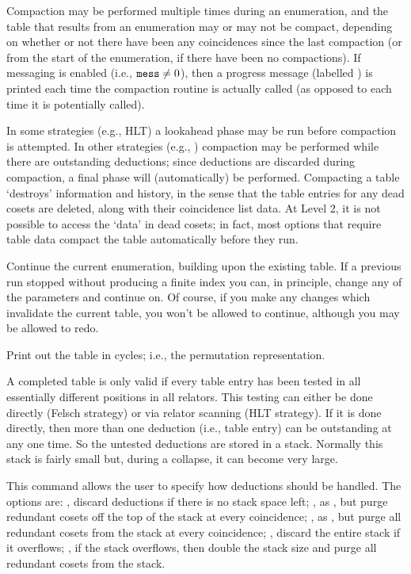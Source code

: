 Compaction may be performed multiple times during an enumeration, and the
  table that results from an enumeration may or may not be compact,
  depending on whether or not there have been any coincidences since the
  last compaction (or from the start of the enumeration, if there have been
  no compactions).
If messaging is enabled (i.e., $\texttt{mess} \ne 0$), then a progress
  message (labelled ) is printed each time the compaction routine
  is actually called (as opposed to each time it is potentially called).

In some strategies (e.g., HLT) a lookahead phase may be run before
  compaction is attempted.
In other strategies (e.g., ) compaction may be performed while
  there are outstanding deductions; since deductions are discarded during
  compaction, a final  phase will (automatically) be performed.
%
Compacting a table `destroys' information and history, in the sense that
  the table entries for any dead cosets are deleted, along with their
  coincidence list data.
At Level 2, it is not possible to access the `data' in dead cosets; in
  fact, most options that require table data compact the table 
  automatically before they run.

\quad{}

Continue the current enumeration, building upon the existing table.
If a previous run stopped without producing a finite index you can, in
  principle, change any of the parameters and continue on.
Of course, if you make any changes which invalidate the current table, you
  won't be allowed to continue, although you may be allowed to redo.

\quad{}

Print out the table in cycles; i.e., the permutation representation.

\quad{}

A completed table is only valid if every table entry has been tested in
  all essentially different positions in all relators.
This testing can either be done directly (Felsch strategy) or via relator
  scanning (HLT strategy).
If it is done directly, then more than one deduction (i.e., table entry)
  can be outstanding at any one time.
So the untested deductions are stored in a stack.
Normally this stack is fairly small but, during a collapse, it can become
  very large.

This command allows the user to specify how deductions should be handled.
The options are:
, discard deductions if there is no stack space left;
, as , but purge redundant cosets off the top of the stack
  at every coincidence;
, as , but purge all redundant cosets from the stack at 
  every coincidence;
, discard the entire stack if it overflows;
, if the stack overflows, then double the stack size and purge all
  redundant cosets from the stack.

